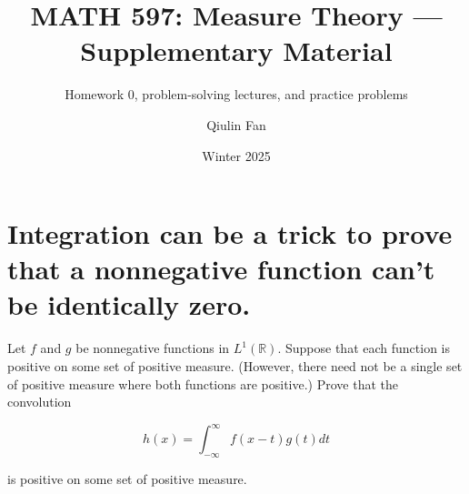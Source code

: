 \documentclass{qlnotes-export}
\title{MATH 597: Measure Theory --- Supplementary Material}
\subtitle{Homework 0, problem-solving lectures, and practice problems}
\author{Qiulin Fan}
\date{Winter 2025}
\begin{document}
\mainmatter
\chapter{Integration can be a trick to prove that a nonnegative function can't be identically zero.}

Let \(f\) and \(g\) be nonnegative functions in \(L^{1}({\mathbb{R}})\). Suppose that each function is positive on some set of positive measure. (However, there need not be a single set of positive measure where both functions are positive.) Prove that the convolution

\[h(x) = \int_{- \infty}^{\infty}f(x - t)g(t)dt\]

is positive on some set of positive measure.
\end{document}
